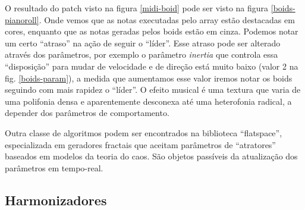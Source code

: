 \documentclass{ppgmus}
\begin{document}
O resultado do patch visto na figura \ref{midi-boid} pode ser visto
na figura \ref{boids-pianoroll}. Onde vemos que as notas executadas pelo array estão destacadas
em cores, enquanto que as notas geradas pelos boids estão em cinza. Podemos notar um certo ``atraso''
 na ação de seguir o ``líder''. Esse atraso pode ser alterado através dos parâmetros, por exemplo
o parâmetro \textit{inertia} que controla essa ``disposição'' para mudar de velocidade e de direção
está muito baixo (valor 2 na fig. \ref{boids-param}), a medida que aumentamos esse valor iremos notar
os boids seguindo com mais rapidez o ``líder''.
O efeito musical é uma textura que varia de uma polifonia densa e aparentemente desconexa até uma 
heterofonia radical, a depender dos parâmetros de comportamento.



Outra classe de algoritmos podem ser encontrados na biblioteca ``flatspace'', especializada
em geradores fractais que aceitam parâmetros de ``atratores'' baseados em modelos da teoria
do caos. São objetos passíveis da atualização dos parâmetros em tempo-real. 
% 




\subsection{Harmonizadores}
\end{document}
